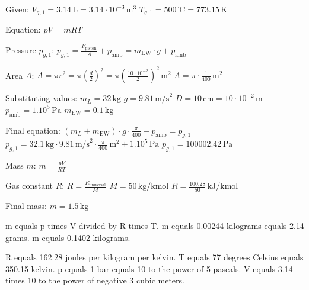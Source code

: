 Given:  
\( V_{g,1} = 3.14 \, \text{L} = 3.14 \cdot 10^{-3} \, \text{m}^3 \)  
\( T_{g,1} = 500^\circ \text{C} = 773.15 \, \text{K} \)  

Equation:  
\( p V = m R T \)  

Pressure \( p_{g,1} \):  
\( p_{g,1} = \frac{F_{\text{piston}}}{A} + p_{\text{amb}} = m_{\text{EW}} \cdot g + p_{\text{amb}} \)  

Area \( A \):  
\( A = \pi r^2 = \pi \left( \frac{d}{2} \right)^2 = \pi \left( \frac{10 \cdot 10^{-2}}{2} \right)^2 \, \text{m}^2 \)  
\( A = \pi \cdot \frac{1}{400} \, \text{m}^2 \)  

Substituting values:  
\( m_L = 32 \, \text{kg} \)  
\( g = 9.81 \, \text{m/s}^2 \)  
\( D = 10 \, \text{cm} = 10 \cdot 10^{-2} \, \text{m} \)  
\( p_{\text{amb}} = 1.10^5 \, \text{Pa} \)  
\( m_{\text{EW}} = 0.1 \, \text{kg} \)  

Final equation:  
\( (m_L + m_{\text{EW}}) \cdot g \cdot \frac{\pi}{400} + p_{\text{amb}} = p_{g,1} \)  
\( p_{g,1} = 32.1 \, \text{kg} \cdot 9.81 \, \text{m/s}^2 \cdot \frac{\pi}{400} \, \text{m}^2 + 1.10^5 \, \text{Pa} \)  
\( p_{g,1} = 100002.42 \, \text{Pa} \)  

Mass \( m \):  
\( m = \frac{p V}{R T} \)  

Gas constant \( R \):  
\( R = \frac{R_{\text{universal}}}{M} \)  
\( M = 50 \, \text{kg/kmol} \)  
\( R = \frac{100.28}{50} \, \text{kJ/kmol} \)  

Final mass:  
\( m = 1.5 \, \text{kg} \)

m equals p times V divided by R times T.  
m equals 0.00244 kilograms equals 2.14 grams.  
m equals 0.1402 kilograms.  

R equals 162.28 joules per kilogram per kelvin.  
T equals 77 degrees Celsius equals 350.15 kelvin.  
p equals 1 bar equals 10 to the power of 5 pascals.  
V equals 3.14 times 10 to the power of negative 3 cubic meters.